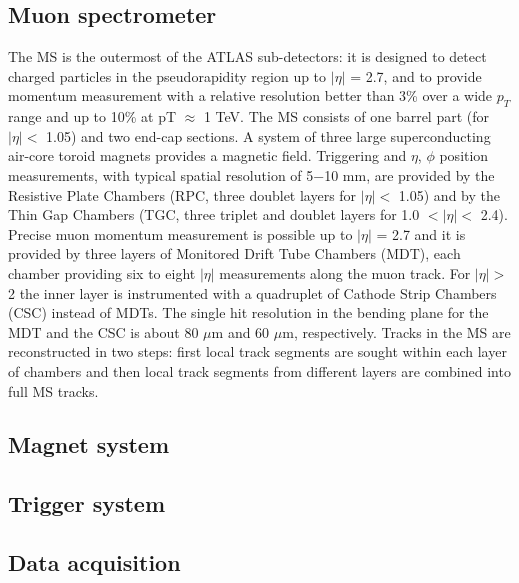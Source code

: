\subsection{Muon spectrometer}
The MS is the outermost of the ATLAS sub-detectors: it is designed to detect charged particles in the pseudorapidity region up to  $ |\eta| $ = 2.7, and to provide momentum measurement with a relative resolution better than 3\% over a wide $p_{T}$ range and up to 10\% at pT $\approx$ 1 TeV. The MS consists of one barrel part (for $ |\eta| <$ 1.05) and two end-cap sections. A system of three large superconducting air-core toroid magnets provides a magnetic field. Triggering and $\eta$, $\phi$ position measurements, with typical spatial resolution of 5−10 mm, are provided by the Resistive Plate Chambers (RPC, three doublet layers for $ |\eta| <$ 1.05) and by the Thin Gap Chambers (TGC, three triplet and doublet layers for 1.0 $<  |\eta|  <$ 2.4). Precise muon momentum measurement is possible up to $ |\eta| $ = 2.7 and it is provided by three layers of Monitored Drift Tube Chambers (MDT), each chamber providing six to eight $ |\eta| $ measurements along the muon track. For $ |\eta|  >$ 2 the inner layer is instrumented with a quadruplet of Cathode Strip Chambers (CSC) instead of MDTs. The single hit resolution in the bending plane for the MDT and the CSC is about 80 $\mu$m and 60 $\mu$m, respectively. Tracks in the MS are reconstructed in two steps: first local track segments are sought within each layer of chambers and then local track segments from different layers are combined into full MS tracks.
\subsection{Magnet system}
\subsection{Trigger system}
\subsection{Data acquisition}